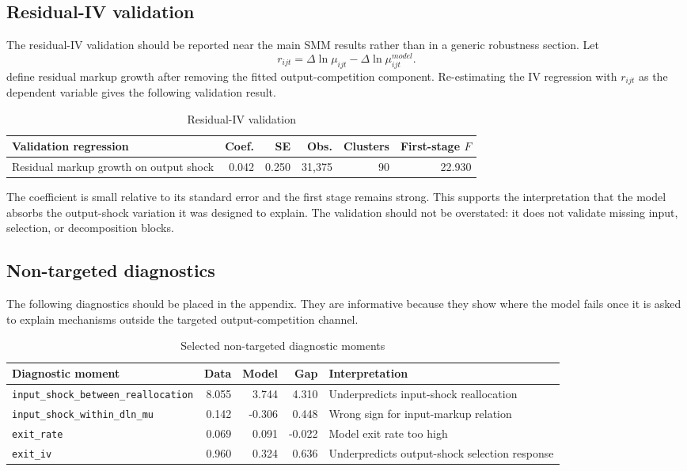 \documentclass[11pt,a4paper]{article}
\begin{document}
\subsection{Residual-IV validation}

The residual-IV validation should be reported near the main SMM results rather than in a generic robustness section. Let
\begin{equation}
    r_{ijt}=\Delta\ln\mu_{ijt}-\Delta\ln\mu^{model}_{ijt}.
\end{equation}
define residual markup growth after removing the fitted output-competition component. Re-estimating the IV regression with \(r_{ijt}\) as the dependent variable gives the following validation result.

\begin{table}[H]
\centering
\caption{Residual-IV validation}
\small
\begin{tabular}{lrrrrr}
\toprule
Validation regression & Coef. & SE & Obs. & Clusters & First-stage \(F\) \\
\midrule
Residual markup growth on output shock & 0.042 & 0.250 & 31,375 & 90 & 22.930 \\
\bottomrule
\end{tabular}
\end{table}

The coefficient is small relative to its standard error and the first stage remains strong. This supports the interpretation that the model absorbs the output-shock variation it was designed to explain. The validation should not be overstated: it does not validate missing input, selection, or decomposition blocks.

\subsection{Non-targeted diagnostics}

The following diagnostics should be placed in the appendix. They are informative because they show where the model fails once it is asked to explain mechanisms outside the targeted output-competition channel.

\begin{table}[H]
\centering
\caption{Selected non-targeted diagnostic moments}
\small

\begin{adjustbox}{max width=\textwidth}
\begin{tabular}{lrrrl}
\toprule
Diagnostic moment & Data & Model & Gap & Interpretation \\
\midrule
\texttt{input\_shock\_between\_reallocation} & 8.055 & 3.744 & 4.310 & Underpredicts input-shock reallocation \\
\texttt{input\_shock\_within\_dln\_mu} & 0.142 & -0.306 & 0.448 & Wrong sign for input-markup relation \\
\texttt{exit\_rate} & 0.069 & 0.091 & -0.022 & Model exit rate too high \\
\texttt{exit\_iv} & 0.960 & 0.324 & 0.636 & Underpredicts output-shock selection response \\
\bottomrule
\end{tabular}
\end{adjustbox}
\end{table}
\end{document}
